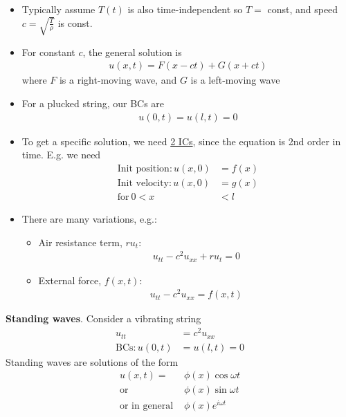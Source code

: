 \documentclass[12pt, letterpaper]{article}
\begin{document}
\begin{itemize}
    \item Typically assume $T(t)$ is also time-independent so 
    $T = $ const, and speed $c = \sqrt{\frac T\rho}$ is const.
    \item For constant $c$, the general solution is 
    \begin{align*}
        u(x,t) = F(x-ct) + G(x+ct)
    \end{align*}
    where $F$ is a right-moving wave, and $G$ is a left-moving wave
    \item For a plucked string, our BCs are 
    \begin{align*}
        u(0,t) = u(l,t) = 0 
    \end{align*}
    \item To get a specific solution, we need \underline{2 ICs}, since
    the equation is 2nd order in time. E.g. we need
    \begin{align*}
        \text{Init position}: u(x,0) &= f(x) \\
        \text{Init velocity}: u(x,0) &= g(x) \\
        \text{for}\ 0 < x &< l
    \end{align*}
    \item There are many variations, e.g.:
    \begin{itemize}
        \item Air resistance term, $ru_t$:
        \begin{align*}
            u_{tt} - c^2u_{xx} + ru_t = 0
        \end{align*}
        \item External force, $f(x,t)$:
        \begin{align*}
            u_{tt} - c^2u_{xx} = f(x,t)
        \end{align*}
    \end{itemize}
\end{itemize}
\textbf{Standing waves}. Consider a vibrating string
\begin{align*}
    u_{tt} &= c^2u_{xx} \\
    \text{BCs}: u(0,t) &= u(l,t) = 0 
\end{align*}
Standing waves are solutions of the form 
\begin{align*}
    u(x,t) =& \phi(x)\cos\omega t \\
    \text{or }& \phi(x) \sin\omega t \\
    \text{or in general }& \phi(x)e^{i\omega t}
\end{align*}
\end{document}
